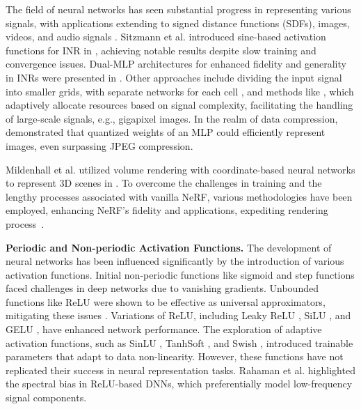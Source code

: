 \iffalse
The field of neural networks has seen substantial progress in representing various signals, with applications extending to signed distance functions (SDFs), images, videos, and audio signals \citep{Deepsdf, ortiz2022isdf, duggal2022mending, li2022learning,kim2022learning, rho2022neural}. Sitzmann et al. introduced sine-based activation functions for INR in \citep{Siren}, achieving notable results despite slow training and convergence issues. Dual-MLP architectures for enhanced fidelity and generality in INRs were presented in \citep{mehta2021modulated}. Other approaches include dividing the input signal into smaller grids, with separate networks for each cell \citep{kadarvish2021ensemble}, and methods like \citep{acorn}, which adaptively allocate resources based on signal complexity, facilitating the handling of large-scale signals, e.g., gigapixel images. In the realm of data compression, \citep{dupont2021coin, dupont2022coin++} demonstrated that quantized weights of an MLP could efficiently represent images, even surpassing JPEG compression.

Mildenhall et al. utilized volume rendering with coordinate-based neural networks to represent 3D scenes in \citep{mildenhall2020nerf}. To overcome the challenges in training and the lengthy processes associated with vanilla NeRF, various methodologies have been employed, enhancing NeRF's fidelity and applications, expediting rendering process~\citep{chen2024far,lin2024fastsr,li2025nerf,uy2024nerf,reiser2021kilonerf,neff2021donerf}.


\textbf{Periodic and Non-periodic Activation Functions.} The development of neural networks has been influenced significantly by the introduction of various activation functions. Initial non-periodic functions like sigmoid and step functions faced challenges in deep networks due to vanishing gradients. Unbounded functions like ReLU \citep{nair2010rectified} were shown to be effective as universal approximators, mitigating these issues \citep{sonoda2017neural}. Variations of ReLU, including Leaky ReLU \citep{maas2013rectifier}, SiLU \citep{elfwing2018sigmoid}, and GELU \citep{hendrycks2016gaussian}, have enhanced network performance. The exploration of adaptive activation functions, such as SinLU \citep{paul2022sinlu}, TanhSoft \citep{biswas2021tanhsoft}, and Swish \citep{ramachandran2017searching}, introduced trainable parameters that adapt to data non-linearity. However, these functions have not replicated their success in neural representation tasks. Rahaman et al. \citep{rahaman2019spectral} highlighted the spectral bias in ReLU-based DNNs, which preferentially model low-frequency signal components.


